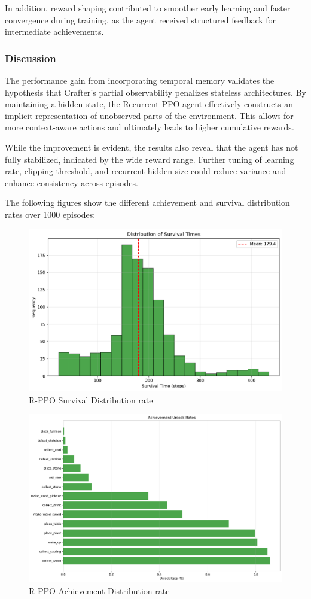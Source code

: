 \documentclass[twocolumn]{article}
\begin{document}
In addition, reward shaping contributed to smoother early learning and faster convergence during training, as the agent received structured feedback for intermediate achievements.

\subsubsection*{Discussion}

The performance gain from incorporating temporal memory validates the hypothesis that Crafter's partial observability penalizes stateless architectures. By maintaining a hidden state, the Recurrent PPO agent effectively constructs an implicit representation of unobserved parts of the environment. This allows for more context-aware actions and ultimately leads to higher cumulative rewards. 

While the improvement is evident, the results also reveal that the agent has not fully stabilized, indicated by the wide reward range. Further tuning of learning rate, clipping threshold, and recurrent hidden size could reduce variance and enhance consistency across episodes.

The following figures show the different achievement and survival distribution rates over 1000 episodes:
\begin{figure}[H]
    \centering
    \includegraphics[width=0.75\linewidth]{images/survival_distribution_ppo_improv2_1000_episodes.png}
    \caption{R-PPO Survival Distribution rate}
    \label{fig:placeholder}
\end{figure}

\begin{figure}[H]
    \centering
    \includegraphics[width=0.75\linewidth]{images/achievement_rates_ppo_improv2_1000_episodes.png}
    \caption{R-PPO Achievement Distribution rate}
    \label{fig:placeholder}
\end{figure}
\end{document}
